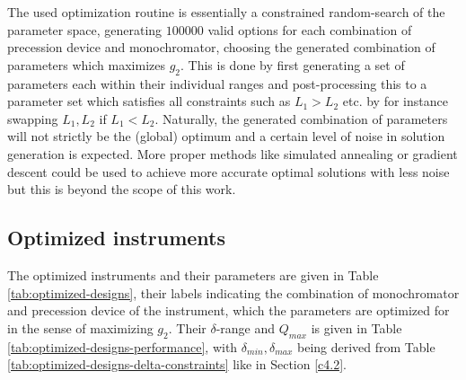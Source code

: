 \documentclass{article}
\begin{document}
The used optimization routine is essentially a constrained random-search of the parameter space, generating $100000$ valid options for each combination of precession device and monochromator, choosing the generated combination of parameters which maximizes $g_2$. This is done by first generating a set of parameters each within their individual ranges and post-processing this to a parameter set which satisfies all constraints such as $L_1>L_2$ etc. by for instance swapping $L_1, L_2$ if $L_1 < L_2$. Naturally, the generated combination of parameters will not strictly be the (global) optimum and a certain level of noise in solution generation is expected. More proper methods like simulated annealing or gradient descent could be used to achieve more accurate optimal solutions with less noise but this is beyond the scope of this work.



\subsection{Optimized instruments}
The optimized instruments and their parameters are given in Table \ref{tab:optimized-designs}, their labels indicating the combination of monochromator and precession device of the instrument, which the parameters are optimized for in the sense of maximizing $g_2$. Their $\delta$-range and $Q_{max}$ is given in Table \ref{tab:optimized-designs-performance}, with $\delta_{min}, \delta_{max}$ being derived from Table \ref{tab:optimized-designs-delta-constraints} like in Section \ref{c4.2}.
\end{document}
